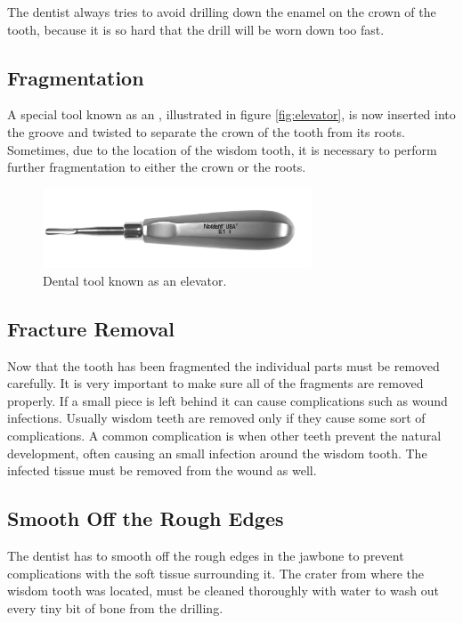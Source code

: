 The dentist always tries to avoid drilling down the enamel on the
crown of the tooth, because it is so hard that the drill will be worn
down too fast.  

\subsection*{Fragmentation}
A special tool known as an , illustrated in figure \vref{fig:elevator},
is now inserted into the groove and twisted to separate the crown of
the tooth from its roots. Sometimes, due to the location of the wisdom
tooth, it is necessary to perform further fragmentation to either the
crown or the roots. 

\begin{figure}
  \centering
  \includegraphics[width=8cm]{./images/problem_domain_surgery_elevator.png}
\caption{Dental tool known as an elevator. \textdagger}
\label{fig:elevator}
\end{figure}


\subsection*{Fracture Removal}
Now that the tooth has been fragmented the individual parts must be removed carefully.
It is very important to make sure all of the fragments are
removed properly. If a small piece is left behind it can cause
complications such as wound infections. 
%
Usually wisdom teeth are removed only if they cause some sort of
complications. A common complication is when other teeth prevent the natural
development, often causing an small infection around the wisdom
tooth. The infected tissue must be removed from the wound as well.      

\subsection*{Smooth Off the Rough Edges}
The dentist has to smooth off the rough edges in the jawbone to
prevent complications with the soft tissue surrounding it.
The crater from where the wisdom tooth was located, must be cleaned
thoroughly with water to wash out every tiny bit of bone from the
drilling. 

